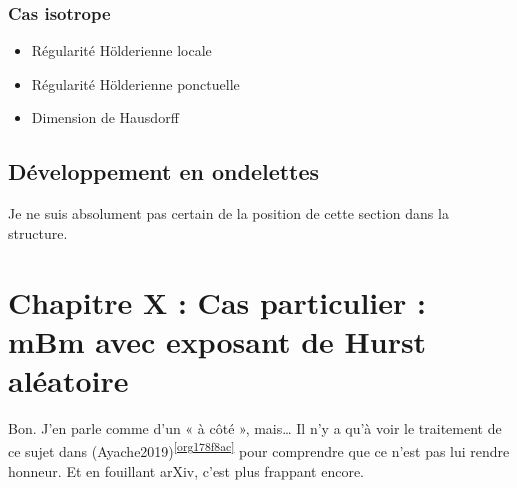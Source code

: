 \documentclass[11pt]{article}
\begin{document}
\subsubsection{Cas isotrope}
\label{sec:orgd4ff62d}
\begin{itemize}
\item Régularité Hölderienne locale
\item Régularité Hölderienne ponctuelle
\item Dimension de Hausdorff
\end{itemize}

\subsection{Développement en ondelettes}
\label{sec:org531f62d}
Je ne suis absolument pas certain de la position de cette section dans
la structure.

\section{Chapitre X : Cas particulier : mBm avec exposant de Hurst aléatoire}
\label{sec:orgf279e24}
Bon. J'en parle comme d'un « à côté », mais\ldots{} Il n'y a qu'à voir le
traitement de ce sujet dans (Ayache2019)\textsuperscript{\ref{org178f8ac}} pour comprendre que ce
n'est pas lui rendre honneur. Et en fouillant arXiv, c'est plus
frappant encore.
\end{document}
